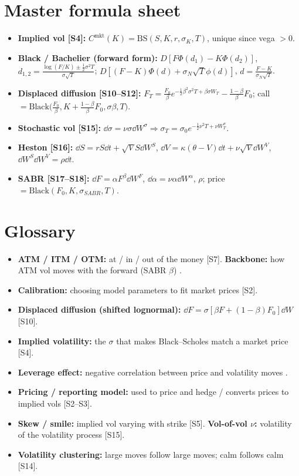 \documentclass[10pt]{article}
\begin{document}
\section{Master formula sheet}
\begin{itemize}
\item \textbf{Implied vol [S4]:} $C^{\text{mkt}}(K)=\mathrm{BS}(S,K,r,\sigma_K,T)$, unique since vega $>0$.
\item \textbf{Black / Bachelier (forward form):} $D[F\Phi(d_1)-K\Phi(d_2)]$, $d_{1,2}=\frac{\log(F/K)\pm\frac12\sigma^2T}{\sigma\sqrt T}$; $D[(F-K)\Phi(d)+\sigma_N\sqrt T\phi(d)]$, $d=\frac{F-K}{\sigma_N\sqrt T}$.
\item \textbf{Displaced diffusion [S10--S12]:} $F_T=\frac{F_0}{\beta}e^{-\frac12\beta^2\sigma^2T+\beta\sigma W_T}-\frac{1-\beta}{\beta}F_0$; call $=\mathrm{Black}\big(\frac{F_0}{\beta},K+\frac{1-\beta}{\beta}F_0,\sigma\beta,T\big)$.
\item \textbf{Stochastic vol [S15]:} $\dd\sigma=\nu\sigma\dd W^\sigma\Rightarrow\sigma_T=\sigma_0e^{-\frac12\nu^2T+\nu W^\sigma_T}$.
\item \textbf{Heston [S16]:} $\dd S=rS\dd t+\sqrt VS\dd W^S$, $\dd V=\kappa(\theta-V)\dd t+\nu\sqrt V\dd W^V$, $\dd W^S\dd W^V=\rho\dd t$.
\item \textbf{SABR [S17--S18]:} $\dd F=\alpha F^\beta\dd W^F$, $\dd\alpha=\nu\alpha\dd W^\alpha$, $\rho$; price $=\mathrm{Black}(F_0,K,\sigma_{SABR},T)$.
\end{itemize}

\section{Glossary}
\begin{itemize}
\item \textbf{ATM / ITM / OTM:} at / in / out of the money [S7]. \quad \textbf{Backbone:} how ATM vol moves with the forward (SABR $\beta$) \beyond.
\item \textbf{Calibration:} choosing model parameters to fit market prices [S2].
\item \textbf{Displaced diffusion (shifted lognormal):} $\dd F=\sigma[\beta F+(1-\beta)F_0]\dd W$ [S10].
\item \textbf{Implied volatility:} the $\sigma$ that makes Black--Scholes match a market price [S4].
\item \textbf{Leverage effect:} negative correlation between price and volatility moves \beyond.
\item \textbf{Pricing / reporting model:} used to price and hedge / converts prices to implied vols [S2--S3].
\item \textbf{Skew / smile:} implied vol varying with strike [S5]. \quad \textbf{Vol-of-vol $\nu$:} volatility of the volatility process [S15].
\item \textbf{Volatility clustering:} large moves follow large moves; calm follows calm [S14].
\end{itemize}
\end{document}

